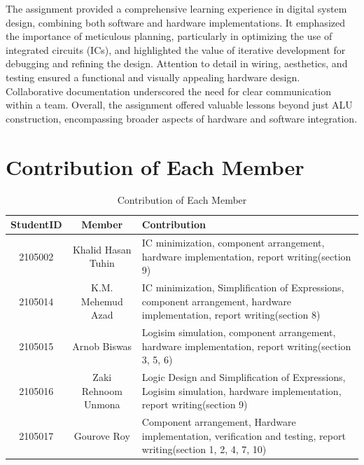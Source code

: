 \documentclass[11pt]{article}
\begin{document}
The assignment provided a comprehensive learning experience in digital system design, combining both software and hardware implementations. It emphasized the importance of meticulous planning, particularly in optimizing the use of integrated circuits (ICs), and highlighted the value of iterative development for debugging and refining the design. Attention to detail in wiring, aesthetics, and testing ensured a functional and visually appealing hardware design. Collaborative documentation underscored the need for clear communication within a team. Overall, the assignment offered valuable lessons beyond just ALU construction, encompassing broader aspects of hardware and software integration.
\pagebreak
\section{Contribution of Each Member}
\begin{table}[ht]
    \centering
    \begin{tabular}{|c|c|p{8cm}|}
        \hline
        \textbf{StudentID} & \textbf{Member} & \textbf{Contribution} \\
        \hline
        2105002 & Khalid Hasan Tuhin & IC minimization, component arrangement, hardware implementation, report writing(section 9) \\
        \hline
        2105014 & K.M. Mehemud Azad & IC minimization, Simplification of Expressions, component arrangement, hardware implementation, report writing(section 8) \\
        \hline
        2105015 & Arnob Biswas & Logisim simulation, component arrangement, hardware implementation, report writing(section 3, 5, 6) \\
        \hline
        2105016 & Zaki Rehnoom Unmona & Logic Design and Simplification of Expressions, Logisim simulation, hardware implementation, report writing(section 9) \\
        \hline
        2105017 & Gourove Roy & Component arrangement, Hardware implementation, verification and testing, report writing(section 1, 2, 4, 7, 10) \\
        \hline
    \end{tabular}
    \caption{Contribution of Each Member}
\end{table}
\end{document}
